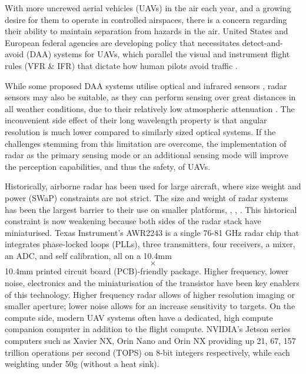 With more uncrewed aerial vehicles (UAVs) in the air each year, and a growing desire for them to operate in controlled airspaces, there is a concern regarding their ability to maintain separation from hazards in the air. United States and European federal agencies are developing policy that necessitates detect-and-avoid (DAA) systems for UAVs, which parallel the visual and instrument flight rules (VFR \& IFR) that dictate how human pilots avoid traffic \cite{easa_easy_access_uas_2024} \cite{rtca_sc228_2025} \cite{serres_wu_2021_nasa_tm}.

While some proposed DAA systems utilise optical and infrared sensors \cite{serres_wu_2021_nasa_tm}, radar sensors may also be suitable, as they can perform sensing over great distances in all weather conditions, due to their relatively low atmospheric attenuation \cite{borden_radar_imaging_airborne_targets_1999}. The inconvenient side effect of their long wavelength property is that angular resolution is much lower compared to similarly sized optical systems. If the challenges stemming from this limitation are overcome, the implementation of radar as the primary sensing mode or an additional sensing mode will improve the perception capabilities, and thus the safety, of UAVs.

Historically, airborne radar has been used for large aircraft, where size weight and power (SWaP) constraints are not strict. The size and weight of radar systems has been the largest barrier to their use on smaller platforms, \cite{Lies2020}, \cite{McLain2015}, \cite{Wang2016}. This historical constraint is now weakening because both sides of the radar stack have miniaturised. Texas Instrument's AWR2243 is a single 76-81 GHz radar chip that integrates phase-locked loops (PLLs), three transmitters, four receivers, a mixer, an ADC, and self calibration, all on a 10.4mm \[\times\] 10.4mm printed circuit board (PCB)-friendly package. Higher frequency, lower noise, electronics and the miniaturisation of the transistor have been key enablers of this technology. Higher frequency radar allows of higher resolution imaging or smaller aperture; lower noise allows for an increase sensitivity to targets. On the compute side, modern UAV systems often have a dedicated, high compute companion computer in addition to the flight compute. NVIDIA's Jetson series computers such as Xavier NX, Orin Nano and Orin NX providing up 21, 67, 157 trillion operations per second (TOPS) on 8-bit integers respectively, while each weighting under 50g (without a heat sink). 

